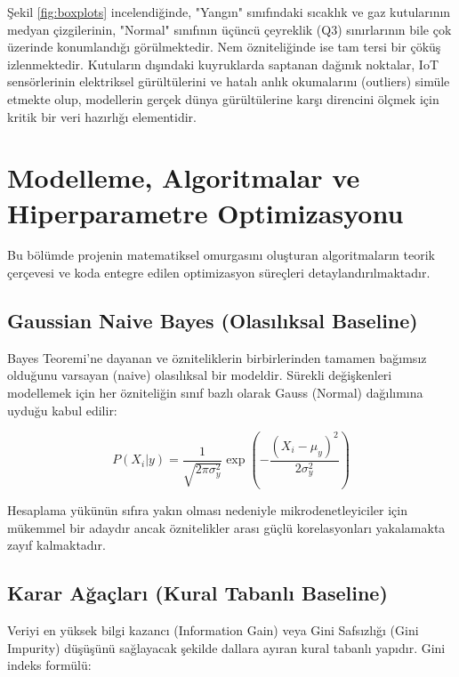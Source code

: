 \documentclass[12pt,a4paper]{article}
\begin{document}
Şekil \ref{fig:boxplots} incelendiğinde, "Yangın" sınıfındaki sıcaklık ve gaz kutularının medyan çizgilerinin, "Normal" sınıfının üçüncü çeyreklik (Q3) sınırlarının bile çok üzerinde konumlandığı görülmektedir. Nem özniteliğinde ise tam tersi bir çöküş izlenmektedir. Kutuların dışındaki kuyruklarda saptanan dağınık noktalar, IoT sensörlerinin elektriksel gürültülerini ve hatalı anlık okumalarını (outliers) simüle etmekte olup, modellerin gerçek dünya gürültülerine karşı direncini ölçmek için kritik bir veri hazırlığı elementidir.

\newpage

\section{Modelleme, Algoritmalar ve Hiperparametre Optimizasyonu}
Bu bölümde projenin matematiksel omurgasını oluşturan algoritmaların teorik çerçevesi ve koda entegre edilen optimizasyon süreçleri detaylandırılmaktadır.

\subsection{Gaussian Naive Bayes (Olasılıksal Baseline)}
Bayes Teoremi'ne dayanan ve özniteliklerin birbirlerinden tamamen bağımsız olduğunu varsayan (naive) olasılıksal bir modeldir. Sürekli değişkenleri modellemek için her özniteliğin sınıf bazlı olarak Gauss (Normal) dağılımına uyduğu kabul edilir:

\begin{equation}
    P(X_i | y) = \frac{1}{\sqrt{2\pi\sigma_y^2}} \exp\left( -\frac{(X_i - \mu_y)^2}{2\sigma_y^2} \right)
\end{equation}

Hesaplama yükünün sıfıra yakın olması nedeniyle mikrodenetleyiciler için mükemmel bir adaydır ancak öznitelikler arası güçlü korelasyonları yakalamakta zayıf kalmaktadır.

\subsection{Karar Ağaçları (Kural Tabanlı Baseline)}
Veriyi en yüksek bilgi kazancı (Information Gain) veya Gini Safsızlığı (Gini Impurity) düşüşünü sağlayacak şekilde dallara ayıran kural tabanlı yapıdır. Gini indeks formülü:
\end{document}
